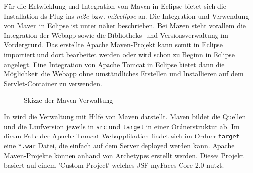 \documentclass[12pt, twoside, a4paper, ngerman]{article}
\begin{document}
Für die Entwicklung und Integration von Maven in \gls{Eclipse} bietet sich die Installation ds Plug-ins \textit{m2e} bzw. \textit{m2eclipse} an. Die Integration und Verwendung von Maven in Eclipse ist unter \cite{EclM2E} näher beschrieben. 
Bei Maven steht vorallem die Integration der Webapp sowie die Bibliotheks- und Versionsverwaltung im Vordergrund. 
Das erstellte \gls{Apache Maven}-Projekt kann somit in Eclipse importiert und dort bearbeitet werden oder wird schon zu Beginn in Eclipse angelegt. 
Eine Integration von \gls{Apache Tomcat} in Eclipse bietet dann die Möglichkeit die Webapp ohne umständliches Erstellen und Installieren auf dem \gls{Servlet-Container} zu verwenden.

\begin{figure}
\centering{}
\caption[\textbf{Maven Verwaltung}]{Skizze der Maven Verwaltung}
\label{fig:Maven_Verwaltung}
\end{figure}

In  wird die Verwaltung mit Hilfe von Maven darstellt.
Maven bildet die Quellen und die Laufversion jeweils in \texttt{src} und \texttt{target} in einer Ordnerstruktur ab. Im diesm Falle der \gls{Apache Tomcat}-Webapplikation findet sich im Ordner \texttt{target} eine \texttt{*.war} Datei, die einfach auf dem Server deployed werden kann. \gls{Apache Maven}-Projekte können anhand von \glspl{Archetype} erstellt werden. Dieses Projekt basiert auf einem 'Custom Project' welches JSF-myFaces Core 2.0 nutzt.
\end{document}
